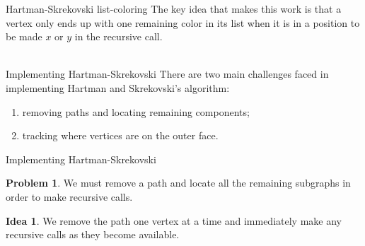 \documentclass[pdf]{beamer}
\theoremstyle{definition}
\theoremstyle{definition}
\theoremstyle{definition}
\theoremstyle{definition}
\newtheorem{prb}{Problem}
\theoremstyle{definition}
\theoremstyle{definition}
\theoremstyle{definition}
\theoremstyle{definition}
\theoremstyle{definition}
\newtheorem{ida}{Idea}
\theoremstyle{definition}
\theoremstyle{definition}
\theoremstyle{definition}
\begin{document}
\begin{frame}{Hartman-Skrekovski list-coloring}
The key idea that makes this work is that a vertex only ends up with one
remaining color in its list when it is in a position to be made $x$ or $y$ in
the recursive call.\\
\hfill\\

\begin{center}
\end{center}
\end{frame}

\begin{frame}{Implementing Hartman-Skrekovski}
There are two main challenges faced in implementing Hartman and Skrekovski's
algorithm:
\begin{enumerate}
\item removing paths and locating remaining components;
\item tracking where vertices are on the outer face.
\end{enumerate}
\end{frame}

\begin{frame}{Implementing Hartman-Skrekovski}
\begin{prb}
We must remove a path and locate all the remaining subgraphs in order to make
recursive calls.
\end{prb}

\begin{ida}
We remove the path one vertex at a time and immediately make any recursive calls
as they become available.
\end{ida}
\end{frame}
\end{document}
